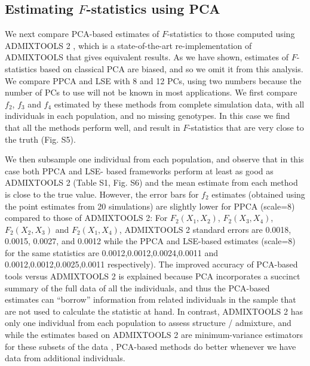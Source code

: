 \documentclass[12pt]{article}
\begin{document}
\subsection{Estimating $F$-statistics using PCA}
We next compare PCA-based estimates of $F$-statistics to those computed using ADMIXTOOLS 2 \citep{maier_limits_2022}, which is a state-of-the-art re-implementation of ADMIXTOOLS \citep{patterson_ancient_2012} that gives equivalent results. As we have shown, estimates of $F$-statistics based on classical PCA are biased, and so we omit it from this analysis. We compare PPCA and LSE with 8 and 12 PCs, using two numbers because the number of PCs to use will not be known in most applications. We first compare $f_2$, $f_3$ and $f_4$ estimated by these methods from complete simulation data, with all individuals in each population, and no missing genotypes. In this case we find that all the methods perform well, and result in $F$-statistics that are very close to the truth (Fig. S5). 

We then subsample one individual from each population, and observe that in this case both PPCA and LSE- based frameworks perform at least as good as ADMIXTOOLS 2 (Table S1, Fig. S6) and the mean estimate from each method is close to the true value. However, the error bars for $f_2$ estimates (obtained using the point estimates from 20 simulations) are slightly lower for PPCA (scale=8) compared to those of ADMIXTOOLS 2: For $F_2(X_1,X_2)$, $F_2(X_3,X_4)$, $F_2(X_2,X_3)$ and $F_2(X_1,X_4)$, ADMIXTOOLS 2 standard errors are 0.0018, 0.0015, 0.0027, and 0.0012 while the PPCA and LSE-based estimates (scale=8) for the same statistics are 0.0012,0.0012,0.0024,0.0011 and 0.0012,0.0012,0.0025,0.0011 respectively). The improved accuracy of PCA-based tools versus ADMIXTOOLS 2 is explained because PCA incorporates a succinct summary of the full data of all the individuals, and thus the PCA-based estimates can ``borrow'' information from related individuals in the sample that are not used to calculate the statistic at hand. In contrast, ADMIXTOOLS 2 has only one individual from each population to assess structure / admixture, and while the estimates based on ADMIXTOOLS 2 are minimum-variance estimators for these subsets of the data \citep{patterson_ancient_2012}, PCA-based methods do better whenever we have data from additional individuals.
\end{document}
